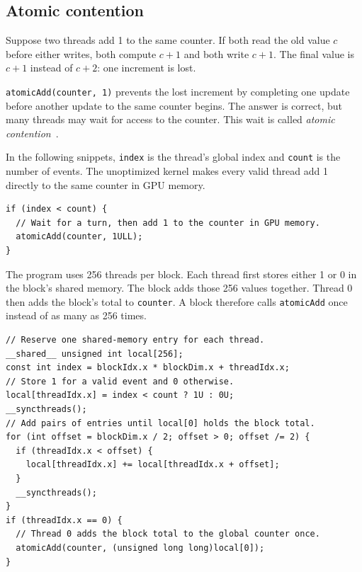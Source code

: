 \documentclass[11pt]{article}
\numberwithin{equation}{section}
\numberwithin{figure}{section}
\numberwithin{table}{section}
\newcommand{\code}[1]{\texttt{#1}}
\begin{document}
\subsection{Atomic contention}

Suppose two threads add 1 to the same counter.  If both read the old value $c$
before either writes, both compute $c+1$ and both write $c+1$.  The final value is
$c+1$ instead of $c+2$: one increment is lost.

\code{atomicAdd(counter, 1)} prevents the lost increment by completing one update
before another update to the same counter begins.  The answer is correct, but many
threads may wait for access to the counter.  This wait is called \emph{atomic
contention}~\cite{cuda-programming-guide}.

In the following snippets, \code{index} is the thread's global index and
\code{count} is the number of events.  The unoptimized kernel makes every valid
thread add 1 directly to the same counter in GPU memory.
\begin{lstlisting}[language=CUDA,numbers=none,caption={Every valid thread updates the same counter.}]
if (index < count) {
  // Wait for a turn, then add 1 to the counter in GPU memory.
  atomicAdd(counter, 1ULL);
}
\end{lstlisting}
The program uses 256 threads per block.  Each thread first stores either 1 or 0 in
the block's shared memory.  The block adds those 256 values together.  Thread 0
then adds the block's total to \code{counter}.  A block therefore calls
\code{atomicAdd} once instead of as many as 256 times.
\begin{lstlisting}[language=CUDA,numbers=none,caption={Add inside the block, then update the counter once.}]
// Reserve one shared-memory entry for each thread.
__shared__ unsigned int local[256];
const int index = blockIdx.x * blockDim.x + threadIdx.x;
// Store 1 for a valid event and 0 otherwise.
local[threadIdx.x] = index < count ? 1U : 0U;
__syncthreads();
// Add pairs of entries until local[0] holds the block total.
for (int offset = blockDim.x / 2; offset > 0; offset /= 2) {
  if (threadIdx.x < offset) {
    local[threadIdx.x] += local[threadIdx.x + offset];
  }
  __syncthreads();
}
if (threadIdx.x == 0) {
  // Thread 0 adds the block total to the global counter once.
  atomicAdd(counter, (unsigned long long)local[0]);
}
\end{lstlisting}
\end{document}
